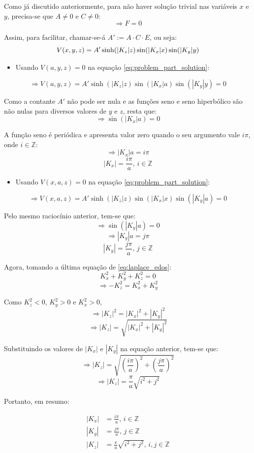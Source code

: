 \documentclass{report}
\begin{document}
Como já discutido anteriormente, para não haver solução trivial nas variáveis $ x $ e $ y $, precisa-se que $ A \neq 0 $ e $ C \neq 0 $:
$$ \Rightarrow F = 0 $$

Assim, para facilitar, chamar-se-á $ A' := A\cdot C\cdot E $, ou seja:
\begin{equation}
    \label{eq:problem_part_solution}
    \centering
    V(x, y, z) = A'\sinh(|K_z|z)\sin(|K_x|x)\sin(|K_y|y)
\end{equation}

\begin{itemize}
  \item Usando $ V(a, y, z) = 0 $ na equação \ref{eq:problem_part_solution}:
\end{itemize}
$$ \Rightarrow V(a, y, z) = A'\sinh(|K_z|z)\sin(|K_x|a)\sin(|K_y|y) = 0 $$

Como a contante $ A' $ não pode ser nula e as funções seno e seno hiperbólico são não nulas para diversos valores de $ y $ e $ z $, resta que:
$$ \Rightarrow \sin(|K_x|a) = 0 $$

A função seno é periódica e apresenta valor zero quando o seu argumento vale $ i\pi $, onde $ i \in \mathbb{Z} $:
$$ \Rightarrow |K_x|a = i\pi $$
$$ |K_x| = \frac{i\pi}{a},\, i \in \mathbb{Z} $$

\begin{itemize}
  \item Usando $ V(x, a, z) = 0 $ na equação \ref{eq:problem_part_solution}:
\end{itemize}
$$ \Rightarrow V(x, a, z) = A'\sinh(|K_z|z)\sin(|K_x|x)\sin(|K_y|a) = 0 $$

Pelo mesmo raciocínio anterior, tem-se que:
$$ \Rightarrow \sin(|K_y|a) = 0 $$
$$ \Rightarrow |K_y|a = j\pi $$
$$ |K_y| = \frac{j\pi}{a},\, j \in \mathbb{Z} $$

Agora, tomando a última equação de \ref{eq:laplace_edos}:
$$ K_x^2 + K_y^2 + K_z^2 = 0 $$
$$ \Rightarrow -K_z^2 = K_x^2 + K_y^2 $$

Como $ K_z^2 < 0 $, $ K_y^2 > 0 $ e $ K_x^2 > 0 $,
$$ \Rightarrow |K_z|^2 = |K_x|^2 + |K_y|^2 $$
$$ \Rightarrow |K_z| = \sqrt{|K_x|^2 + |K_y|^2} $$

Substituindo os valores de $ |K_x| $ e $ |K_y| $ na equação anterior, tem-se que:
$$ \Rightarrow |K_z| = \sqrt{\left(\frac{i\pi}{a}\right)^2 + \left(\frac{j\pi}{a}\right)^2} $$
$$ \Rightarrow |K_z| = \frac{\pi}{a}\sqrt{i^2 + j^2} $$

Portanto, em resumo:

\vspace*{-1.5\baselineskip}
\begin{center}
  \begin{align}
    \label{eq:Kx_values}
    |K_x| &= \frac{i\pi}{a},\, i \in \mathbb{Z} \\
    \label{eq:Ky_values}
    |K_y| &= \frac{j\pi}{a},\, j \in \mathbb{Z} \\
    \label{eq:Kz_values}
    |K_z| &= \frac{\pi}{a}\sqrt{i^2 + j^2},\, i, j \in \mathbb{Z}
  \end{align}
\end{center}
\end{document}
